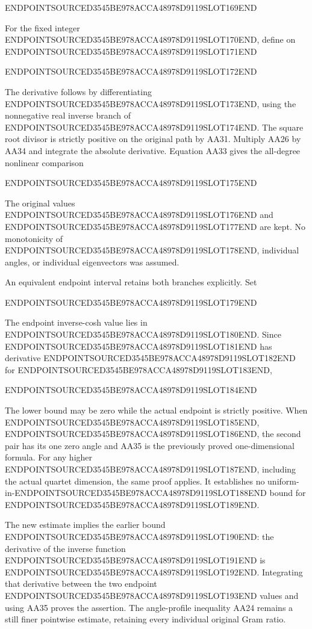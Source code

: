 ENDPOINTSOURCED3545BE978ACCA48978D9119SLOT169END

For the fixed integer ENDPOINTSOURCED3545BE978ACCA48978D9119SLOT170END, define on ENDPOINTSOURCED3545BE978ACCA48978D9119SLOT171END

ENDPOINTSOURCED3545BE978ACCA48978D9119SLOT172END

The derivative follows by differentiating ENDPOINTSOURCED3545BE978ACCA48978D9119SLOT173END, using the nonnegative real inverse branch of ENDPOINTSOURCED3545BE978ACCA48978D9119SLOT174END. The square root divisor is strictly positive on the original path by AA31. Multiply AA26 by AA34 and integrate the absolute derivative. Equation AA33 gives the all-degree nonlinear comparison

ENDPOINTSOURCED3545BE978ACCA48978D9119SLOT175END

The original values ENDPOINTSOURCED3545BE978ACCA48978D9119SLOT176END and ENDPOINTSOURCED3545BE978ACCA48978D9119SLOT177END are kept. No monotonicity of ENDPOINTSOURCED3545BE978ACCA48978D9119SLOT178END, individual angles, or individual eigenvectors was assumed.

An equivalent endpoint interval retains both branches explicitly. Set

ENDPOINTSOURCED3545BE978ACCA48978D9119SLOT179END

The endpoint inverse-cosh value lies in ENDPOINTSOURCED3545BE978ACCA48978D9119SLOT180END. Since ENDPOINTSOURCED3545BE978ACCA48978D9119SLOT181END has derivative ENDPOINTSOURCED3545BE978ACCA48978D9119SLOT182END for ENDPOINTSOURCED3545BE978ACCA48978D9119SLOT183END,

ENDPOINTSOURCED3545BE978ACCA48978D9119SLOT184END

The lower bound may be zero while the actual endpoint is strictly positive. When ENDPOINTSOURCED3545BE978ACCA48978D9119SLOT185END, ENDPOINTSOURCED3545BE978ACCA48978D9119SLOT186END, the second pair has its one zero angle and AA35 is the previously proved one-dimensional formula. For any higher ENDPOINTSOURCED3545BE978ACCA48978D9119SLOT187END, including the actual quartet dimension, the same proof applies. It establishes no uniform-in-ENDPOINTSOURCED3545BE978ACCA48978D9119SLOT188END bound for ENDPOINTSOURCED3545BE978ACCA48978D9119SLOT189END.

The new estimate implies the earlier bound ENDPOINTSOURCED3545BE978ACCA48978D9119SLOT190END: the derivative of the inverse function ENDPOINTSOURCED3545BE978ACCA48978D9119SLOT191END is ENDPOINTSOURCED3545BE978ACCA48978D9119SLOT192END. Integrating that derivative between the two endpoint ENDPOINTSOURCED3545BE978ACCA48978D9119SLOT193END values and using AA35 proves the assertion. The angle-profile inequality AA24 remains a still finer pointwise estimate, retaining every individual original Gram ratio.

